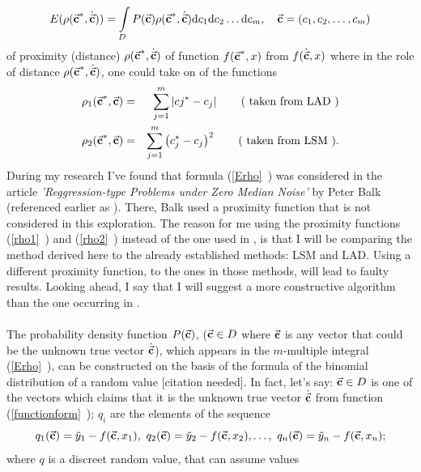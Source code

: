 \begin{equation}
E(\rho(\vec{\textbf{c}}^{*},\dot{\vec{\textbf{c}}}))= \int\limits_{D}P(\vec{\textbf{c}})\rho(\vec{\textbf{c}}^{*},\dot{\vec{\textbf{c}}})\mathrm{d}c_{1}\mathrm{d}c_{2}\dots \mathrm{d}c_{m}, \quad \vec{\textbf{c}} = (c_{1},c_{2},\dots,c_{m}) \label{Erho}
\end{equation}
of proximity (distance) $\rho(\vec{\textbf{c}}^{*},\dot{\vec{\textbf{c}}})$ of function $f(\vec{\textbf{c}}^{*},x)$ from $f(\dot{\vec{\textbf{c}}},x)$ where in the role of distance $\rho(\vec{\textbf{c}}^{*},\dot{\vec{\textbf{c}}})$, one could take on of the functions
\begin{eqnarray}
\rho_{1}(\vec{\textbf{c}}^{*},\vec{\textbf{c}}) &=& \sum\limits_{j=1}^{m} \left| c{j}^{*}-c_{j} \right| \label{rho1} \qquad \text{( taken from LAD )}\\
\rho_{2}(\vec{\textbf{c}}^{*},\vec{\textbf{c}}) &=& \sum\limits_{j=1}^{m} \left( c_{j}^{*}-c_{j} \right)^{2} \label{rho2} \qquad \text{( taken from LSM ).}
\end{eqnarray}
During my research I've found that formula (\vref{Erho}~) was considered in the article \textit{'Reggression-type Problems under Zero Median Noise'} by Peter Balk (referenced earlier as \citep{balk_2010}). There, Balk used a proximity function that is not considered in this exploration. The reason for me using the proximity functions (\vref{rho1}~) and (\vref{rho2}~) instead of the one used in \citep{balk_2010}, is that I will be comparing the method derived here to the already established methods: LSM and LAD. Using a different proximity function, to the ones in those methods, will lead to faulty results. Looking ahead, I say that I will suggest a more constructive algorithm than the one occurring in \citep{balk_2010}.\\
\\
The probability density function $P(\vec{\textbf{c}})$, ($\vec{\textbf{c}} \in D$ where $\vec{\textbf{c}}$ is any vector that could be the unknown true vector $\dot{\vec{\textbf{c}}}$), which appears in the $m$-multiple integral (\vref{Erho}~), can be constructed on the basis of the formula of the binomial distribution of a random value [citation needed]. In fact, let's say: $\vec{\textbf{c}} \in D$ is one of the vectors which claims that it is the unknown true vector $ \dot{\vec{\textbf{c}}}$ from function (\vref{functionform}~); $q_{i}$ are the elements of the sequence
\begin{equation}
q_{1}(\vecc)=\tilde{y}_{1}-f(\vecc,x_{1}),\ q_{2}(\vecc)=\tilde{y}_{2}-f(\vecc,x_{2}), \dots, \ q_{n}(\vecc)=\tilde{y}_{n}-f(\vecc,x_{n}); \label{sequence}
\end{equation}
where $q$ is a discreet random value, that can assume values
